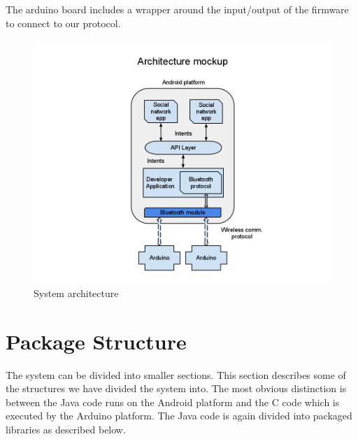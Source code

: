 The arduino board includes a wrapper around the input/output of the firmware to connect to our protocol.
\begin{figure}[hb!]
\centering \includegraphics[scale=0.40]{img/architecture-diagram.png}
\caption{System architecture}
\label{fig:architecture}
\end{figure}

\section{Package Structure}
The system can be divided into smaller sections. This section describes some of the structures
we have divided the system into. The most obvious distinction is between the Java code runs
on the Android platform and the C code which is executed by the Arduino platform.
The Java code is again divided into packaged libraries as described below.


